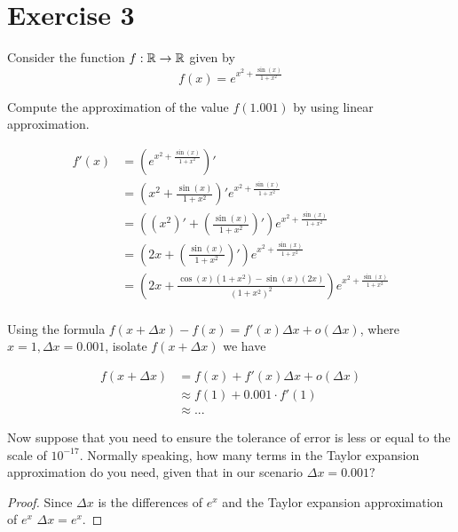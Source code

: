 \documentclass{homework}
\newcommand{\R}{\bb{R}} %
\newcommand{\?}{\stackrel{?}{=}}
\theoremstyle{definition}
\begin{document}
\newpage
\section*{Exercise 3}

Consider the function $f:\R\to\R$ given by \[f(x)=e^{x^2+\frac{\sin(x)}{1+x^2}}\]

\question[1] Compute the approximation of the value $f(1.001)$ by using linear approximation.

\begin{align*}
    f'(x)&=(e^{x^2+\frac{\sin(x)}{1+x^2}})'\\
    &=(x^2+\frac{\sin(x)}{1+x^2})'e^{x^2+\frac{\sin(x)}{1+x^2}}\\
    &=((x^2)'+(\frac{\sin(x)}{1+x^2})')e^{x^2+\frac{\sin(x)}{1+x^2}}\\
    &=(2x+(\frac{\sin(x)}{1+x^2})')e^{x^2+\frac{\sin(x)}{1+x^2}}\\
    &=(2x+\frac{\cos(x)(1+x^2)-\sin(x)(2x)}{(1+x^2)^2})e^{x^2+\frac{\sin(x)}{1+x^2}}\\
\end{align*}

Using the formula $f(x+\Delta x)-f(x)=f'(x)\Delta x+o(\Delta x)$, where $x=1, \Delta x=0.001$, isolate $f(x+\Delta x)$ we have

\begin{align*}
    f(x+\Delta x) &= f(x) + f'(x)\Delta x + o(\Delta x)\\
    &\approx f(1) + 0.001\cdot f'(1)\\
    &\approx ...
\end{align*}

\question[2] Now suppose that you need to ensure the tolerance of error is less or equal to the scale of $10^{-17}$. Normally speaking, how many terms in the Taylor expansion approximation do you need, given that in our scenario $\Delta x=0.001?$

\begin{proof}
    Since $\Delta x$ is the differences of $e^x$ and the Taylor expansion approximation of $e^x$ $\Delta x=e^x$.
\end{proof}
\end{document}
